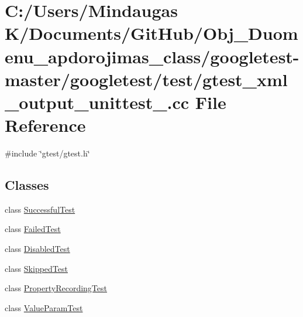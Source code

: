 \hypertarget{googletest-master_2googletest_2test_2gtest__xml__output__unittest___8cc}{}\section{C\+:/\+Users/\+Mindaugas K/\+Documents/\+Git\+Hub/\+Obj\+\_\+\+Duomenu\+\_\+apdorojimas\+\_\+class/googletest-\/master/googletest/test/gtest\+\_\+xml\+\_\+output\+\_\+unittest\+\_\+.cc File Reference}
\label{googletest-master_2googletest_2test_2gtest__xml__output__unittest___8cc}
{\ttfamily \#include \char`\"{}gtest/gtest.\+h\char`\"{}}\newline
\subsection*{Classes}
\begin{DoxyCompactItemize}
\item 
class \mbox{\hyperlink{class_successful_test}{Successful\+Test}}
\item 
class \mbox{\hyperlink{class_failed_test}{Failed\+Test}}
\item 
class \mbox{\hyperlink{class_disabled_test}{Disabled\+Test}}
\item 
class \mbox{\hyperlink{class_skipped_test}{Skipped\+Test}}
\item 
class \mbox{\hyperlink{class_property_recording_test}{Property\+Recording\+Test}}
\item 
class \mbox{\hyperlink{class_value_param_test}{Value\+Param\+Test}}
\end{DoxyCompactItemize}
